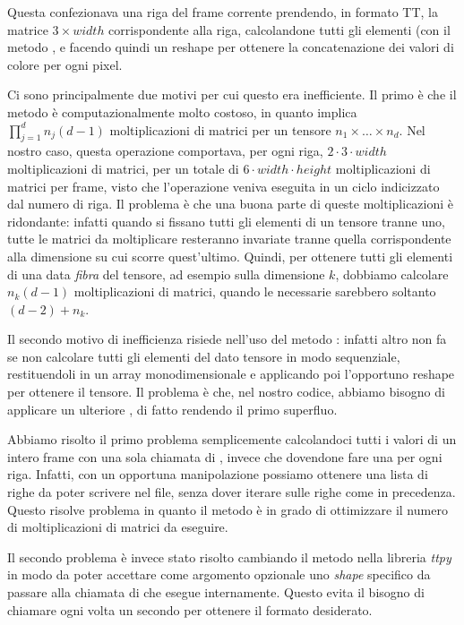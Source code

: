 \documentclass[11pt,a4paper]{article}
\begin{document}
Questa confezionava una riga del frame corrente prendendo, in formato TT, la matrice $3 \times width$ corrispondente alla riga, calcolandone tutti gli elementi (con il metodo , e facendo quindi un reshape per ottenere la concatenazione dei valori di colore per ogni pixel.

Ci sono principalmente due motivi per cui questo era inefficiente.
Il primo è che il metodo  è computazionalmente molto costoso, in quanto implica $\prod_{j=1}^d n_j (d-1)$ moltiplicazioni di matrici per un tensore $n_1 \times \ldots \times n_d$. Nel nostro caso, questa operazione comportava, per ogni riga, $2 \cdot 3 \cdot width$ moltiplicazioni di matrici, per un totale di $6 \cdot width \cdot height$ moltiplicazioni di matrici per frame, visto che l'operazione veniva eseguita in un ciclo indicizzato dal numero di riga. Il problema è che una buona parte di queste moltiplicazioni è ridondante: infatti quando si fissano tutti gli elementi di un tensore tranne uno, tutte le matrici da moltiplicare resteranno invariate tranne quella corrispondente alla dimensione su cui scorre quest'ultimo. Quindi, per ottenere tutti gli elementi di una data \emph{fibra} del tensore, ad esempio sulla dimensione $k$, dobbiamo calcolare $n_k (d-1)$ moltiplicazioni di matrici, quando le necessarie sarebbero soltanto $(d-2) + n_k$.

Il secondo motivo di inefficienza risiede nell'uso del metodo : infatti  altro non fa se non calcolare tutti gli elementi del dato tensore in modo sequenziale, restituendoli in un array monodimensionale e applicando poi l'opportuno reshape per ottenere il tensore. Il problema è che, nel nostro codice, abbiamo bisogno di applicare un ulteriore , di fatto rendendo il primo superfluo.

Abbiamo risolto il primo problema semplicemente calcolandoci tutti i valori di un intero frame con una sola chiamata di , invece che dovendone fare una per ogni riga. Infatti, con un opportuna manipolazione possiamo ottenere una lista di righe da poter scrivere nel file, senza dover iterare sulle righe come in precedenza. Questo risolve problema in quanto il metodo  è in grado di ottimizzare il numero di moltiplicazioni di matrici da eseguire.

Il secondo problema è invece stato risolto cambiando il metodo  nella libreria \emph{ttpy} in modo da poter accettare come argomento opzionale uno \emph{shape} specifico da passare alla chiamata di  che esegue internamente. Questo evita il bisogno di chiamare ogni volta un secondo  per ottenere il formato desiderato.
\end{document}
